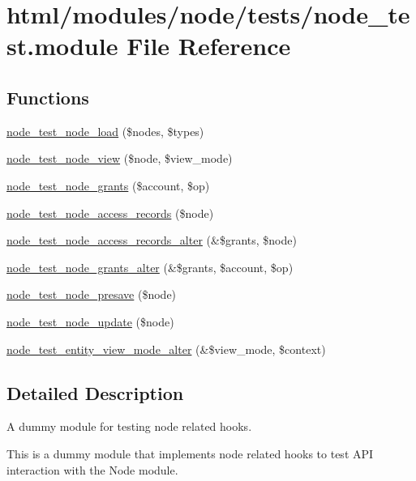 \hypertarget{node__test_8module}{
\section{html/modules/node/tests/node\_\-test.module File Reference}
\label{node__test_8module}
}
\subsection*{Functions}
\begin{DoxyCompactItemize}
\item 
\hyperlink{node__test_8module_afe2b02b40a91d29185136d99714bf73f}{node\_\-test\_\-node\_\-load} (\$nodes, \$types)
\item 
\hyperlink{node__test_8module_a7a0e0b7d9827ab5e62af39ecc0c3c0fd}{node\_\-test\_\-node\_\-view} (\$node, \$view\_\-mode)
\item 
\hyperlink{node__test_8module_acc4ea4604d3c94a6eb3ba93e665bec9f}{node\_\-test\_\-node\_\-grants} (\$account, \$op)
\item 
\hyperlink{node__test_8module_ab221632708d589efef84d438874fb943}{node\_\-test\_\-node\_\-access\_\-records} (\$node)
\item 
\hyperlink{node__test_8module_ab0d2902a1e4481b0258f4a8270cfd509}{node\_\-test\_\-node\_\-access\_\-records\_\-alter} (\&\$grants, \$node)
\item 
\hyperlink{node__test_8module_aad255cfb8f19e556fe990c02cf64600d}{node\_\-test\_\-node\_\-grants\_\-alter} (\&\$grants, \$account, \$op)
\item 
\hyperlink{node__test_8module_a5dc9a5a8b514e3717ac1533d79fa0077}{node\_\-test\_\-node\_\-presave} (\$node)
\item 
\hyperlink{node__test_8module_a5db97f3455d3967072e99ff4275327e9}{node\_\-test\_\-node\_\-update} (\$node)
\item 
\hyperlink{node__test_8module_aa27dc29667a3f10904c21b8b4ffbea0e}{node\_\-test\_\-entity\_\-view\_\-mode\_\-alter} (\&\$view\_\-mode, \$context)
\end{DoxyCompactItemize}


\subsection{Detailed Description}
A dummy module for testing node related hooks.

This is a dummy module that implements node related hooks to test API interaction with the Node module. 

